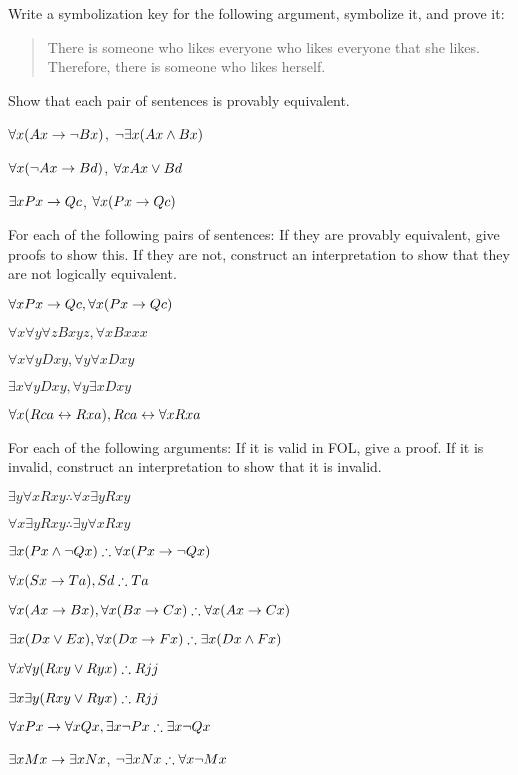 \begin{practiceproblems}
\solutions
\problempart
\label{pr.likes}
Write a symbolization key for the following argument, symbolize it, and prove it:
\begin{quote}
There is someone who likes everyone who likes everyone that she likes. Therefore, there is someone who likes herself.
\end{quote}


\problempart
Show that each pair of sentences is provably equivalent.
\begin{earg}
\item $\forall x (Ax\rightarrow \neg Bx)$, $\neg\exists x(Ax \mathbin{\wedge} Bx)$
\item $\forall x (\neg Ax\rightarrow Bd)$, $\forall x Ax \vee Bd$
\item $\exists x Px \rightarrow Qc$, $\forall x (Px \rightarrow Qc)$
\end{earg}

\solutions
\problempart
\label{pr.FOLequivornot}
For each of the following pairs of sentences: If they are provably equivalent, give proofs to show this. If they are not, construct an interpretation to show that they are not logically equivalent.
\begin{earg}
\item $\forall x Px \rightarrow Qc, \forall x (Px \rightarrow Qc)$
\item $\forall x\forall y \forall z Bxyz, \forall x Bxxx$
\item $\forall x\forall y Dxy, \forall y\forall x Dxy$
\item $\exists x\forall y Dxy, \forall y\exists x Dxy$
\item $\forall x (Rca \leftrightarrow Rxa), Rca \leftrightarrow \forall x Rxa$
\end{earg}

\solutions
\problempart
\label{pr.FOLvalidornot}
For each of the following arguments: If it is valid in FOL, give a proof. If it is invalid, construct an interpretation to show that it is invalid.
\begin{earg}
\item $\exists y\forall x Rxy \therefore \forall x\exists y Rxy$
\item $\forall x\exists y Rxy \therefore  \exists y\forall x Rxy$
\item $\exists x(Px \eand \enot Qx) \therefore \forall x(Px \eif \enot Qx)$
\item $\forall x(Sx \eif Ta), Sd \therefore Ta$
\item $\forall x(Ax\eif Bx), \forall x(Bx \eif Cx) \therefore \forall x(Ax \eif Cx)$
\item $\exists x(Dx \eor Ex), \forall x(Dx \eif Fx) \therefore \exists x(Dx \eand Fx)$
\item $\forall x\forall y(Rxy \eor Ryx) \therefore Rjj$
\item $\exists x\exists y(Rxy \eor Ryx) \therefore Rjj$
\item $\forall x Px \eif \forall x Qx, \exists x \enot Px \therefore \exists x \enot Qx$
\item $\exists x Mx \rightarrow \exists x Nx$, $\enot \exists x Nx\therefore  \forall x \enot Mx$
\end{earg}

\end{practiceproblems}



